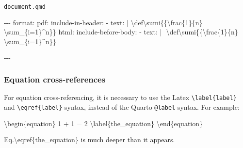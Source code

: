 \documentclass[
  letterpaper,
  DIV=11,
  numbers=noendperiod]{scrartcl}
\newenvironment{Shaded}{\begin{snugshade}}{\end{snugshade}}
\newcommand{\AttributeTok}[1]{\textcolor[rgb]{0.40,0.45,0.13}{#1}}
\newcommand{\CharTok}[1]{\textcolor[rgb]{0.13,0.47,0.30}{#1}}
\newcommand{\ExtensionTok}[1]{\textcolor[rgb]{0.00,0.23,0.31}{#1}}
\newcommand{\FunctionTok}[1]{\textcolor[rgb]{0.28,0.35,0.67}{#1}}
\newcommand{\KeywordTok}[1]{\textcolor[rgb]{0.00,0.23,0.31}{#1}}
\newcommand{\NormalTok}[1]{\textcolor[rgb]{0.00,0.23,0.31}{#1}}
\newcommand{\PreprocessorTok}[1]{\textcolor[rgb]{0.68,0.00,0.00}{#1}}
\newcommand{\SpecialCharTok}[1]{\textcolor[rgb]{0.37,0.37,0.37}{#1}}
\newcommand{\SpecialStringTok}[1]{\textcolor[rgb]{0.13,0.47,0.30}{#1}}
\theoremstyle{plain}
\theoremstyle{remark}
\begin{document}
\begin{codelisting}

\caption{\texttt{document.qmd}}

\begin{Shaded}
\begin{Highlighting}[]
\PreprocessorTok{{-}{-}{-}}
\FunctionTok{format}\KeywordTok{:}
\AttributeTok{    }\FunctionTok{pdf}\KeywordTok{:}
\AttributeTok{        }\FunctionTok{include{-}in{-}header}\KeywordTok{:}
\KeywordTok{            {-} }\FunctionTok{text}\KeywordTok{:}\AttributeTok{ }\CharTok{|}
\NormalTok{                \textbackslash{}def\textbackslash{}sumi\{\{\textbackslash{}frac\{1\}\{n\} \textbackslash{}sum\_\{i=1\}\^{}n\}\}}
\AttributeTok{    }\FunctionTok{html}\KeywordTok{:}
\AttributeTok{        }\FunctionTok{include{-}before{-}body}\KeywordTok{:}
\KeywordTok{            {-} }\FunctionTok{text}\KeywordTok{:}\AttributeTok{ }\CharTok{|}
\NormalTok{                $$}
\NormalTok{                    \textbackslash{}def\textbackslash{}sumi\{\{\textbackslash{}frac\{1\}\{n\} \textbackslash{}sum\_\{i=1\}\^{}n\}\}}
\NormalTok{                $$}

\PreprocessorTok{{-}{-}{-}}
\end{Highlighting}
\end{Shaded}

\end{codelisting}

\hypertarget{equation-cross-references}{%
\subsubsection{Equation
cross-references}\label{equation-cross-references}}

For equation cross-referencing, it is necessary to use the Latex
\texttt{\textbackslash{}label\{label\}} and
\texttt{\textbackslash{}eqref\{label\}} syntax, instead of the Quarto
\texttt{@label} syntax. For example:

\begin{Shaded}
\begin{Highlighting}[]
\KeywordTok{\textbackslash{}begin}\NormalTok{\{}\ExtensionTok{equation}\NormalTok{\}}
\SpecialStringTok{    1 + 1 = 2}
\SpecialCharTok{\textbackslash{}label}\SpecialStringTok{\{the\_equation\}}
\KeywordTok{\textbackslash{}end}\NormalTok{\{}\ExtensionTok{equation}\NormalTok{\}}

\NormalTok{Eq.}\KeywordTok{\textbackslash{}eqref}\NormalTok{\{}\ExtensionTok{the\_equation}\NormalTok{\} is much deeper than it appears.}
\end{Highlighting}
\end{Shaded}
\end{document}
